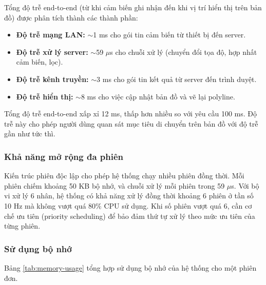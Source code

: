 \hspace{0.5cm} Tổng độ trễ end-to-end (từ khi cảm biến ghi nhận đến khi vị trí hiển thị trên bản đồ) được phân tích thành các thành phần:

\begin{itemize}
    \item \textbf{Độ trễ mạng LAN:} $\sim$1 ms cho gói tin cảm biến từ thiết bị đến server.
    \item \textbf{Độ trễ xử lý server:} $\sim$59 $\mu$s cho chuỗi xử lý (chuyển đổi tọa độ, hợp nhất cảm biến, lọc).
    \item \textbf{Độ trễ kênh truyền:} $\sim$3 ms cho gói tin kết quả từ server đến trình duyệt.
    \item \textbf{Độ trễ hiển thị:} $\sim$8 ms cho việc cập nhật bản đồ và vẽ lại polyline.
\end{itemize}

Tổng độ trễ end-to-end xấp xỉ 12 ms, thấp hơn nhiều so với yêu cầu 100 ms. Độ trễ này cho phép người dùng quan sát mục tiêu di chuyển trên bản đồ với độ trễ gần như tức thì.

\subsubsection{Khả năng mở rộng đa phiên}

\hspace{0.5cm} Kiến trúc phiên độc lập cho phép hệ thống chạy nhiều phiên đồng thời. Mỗi phiên chiếm khoảng 50 KB bộ nhớ, và chuỗi xử lý mỗi phiên trong 59 $\mu$s. Với bộ vi xử lý 6 nhân, hệ thống có khả năng xử lý đồng thời khoảng 6 phiên ở tần số 10 Hz mà không vượt quá 80\% CPU sử dụng. Khi số phiên vượt quá 6, cần cơ chế ưu tiên (priority scheduling) để bảo đảm thứ tự xử lý theo mức ưu tiên của từng phiên.

\subsubsection{Sử dụng bộ nhớ}

\hspace{0.5cm} Bảng \ref{tab:memory-usage} tổng hợp sử dụng bộ nhớ của hệ thống cho một phiên đơn.

